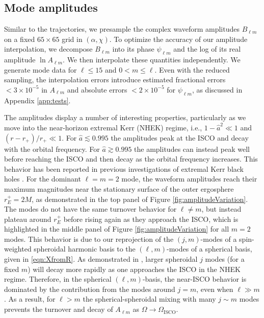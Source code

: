 \documentclass[%
 reprint,
 nofootinbib,
 amsmath,amssymb,
 aps,
 prd,
]{revtex4-2}
\begin{document}
\subsection{Mode amplitudes}
\label{sec:amp}

Similar to the trajectories, we presample the complex waveform amplitudes $B_{\ell m}$ on a fixed $65 \times 65$ grid in $(\alpha, \chi)$. To optimize the accuracy of our amplitude interpolation, we decompose $B_{\ell m}$ into its phase $\psi_{\ell m}$ and the log of its real amplitude $\ln A_{\ell m}$. We then interpolate these quantities independently. We generate mode data for $\ell \leq 15$ and $0 < m \leq \ell$. Even with the reduced sampling, the interpolation errors introduce estimated fractional errors $< 3\times 10^{-5}$ in $A_{\ell m}$ and absolute errors $<2 \times 10^{-5}$ for $\psi_{\ell m}$, as discussed in Appendix \ref{app:tests}.


The amplitudes display a number of interesting properties, particularly as we move into the near-horizon extremal Kerr (NHEK) regime, i.e., $1-\hat{a}^2 \ll 1$ and $(r-r_+)/r_+ \ll 1$. For $\hat{a} \lesssim 0.995$ the amplitudes peak at the ISCO and decay with the orbital frequency. For $\hat{a} \gtrsim 0.995$ the amplitudes can instead peak well before reaching the ISCO and then decay as the orbital frequency increases. This behavior has been reported in previous investigations of extremal Kerr black holes \cite{GralPorfWarb15, GralHughWarb16}. For the dominant $\ell = m = 2$ mode, the waveform amplitudes reach their maximum magnitudes near the stationary surface of the outer ergosphere $r_E^+ = 2M$, as demonstrated in the top panel of Figure \ref{fig:amplitudeVariation}. The modes do not have the same turnover behavior for $\ell \neq m$, but instead plateau around $r_E^+$ before rising again as they approach the ISCO, which is highlighted in the middle panel of Figure \ref{fig:amplitudeVariation} for all $m =2$ modes. This behavior is due to our reprojection of the $(j, m)$-modes of a spin-weighted spheroidal harmonic basis to the $(\ell, m)$-modes of a spherical basis, given in \eqref{eqn:XfromR}. As demonstrated in \cite{GralPorfWarb15}, larger spheroidal $j$ modes (for a fixed $m$) will decay more rapidly as one approaches the ISCO in the NHEK regime. Therefore, in the spherical $(\ell, m)$-basis, the near-ISCO behavior is dominated by the contribution from the modes around $j=m$, even when $\ell \gg m$. As a result, for $\ell > m$ the spherical-spheroidal mixing with many $j\sim m$ modes prevents the turnover and decay of $A_{\ell m}$ as $\Omega \rightarrow \Omega_\mathrm{ISCO}$.
\end{document}
